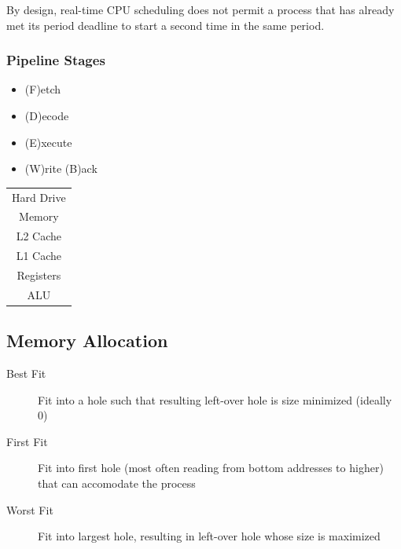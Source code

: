 \documentclass[a4paper]{article}
\begin{document}
\begin{multicols*}{2}
    By design, real-time CPU scheduling does not permit a process that has
    already met its period deadline to start a second time in the same period.

    \subsubsection*{Pipeline Stages}
    \begin{multicols*}{2}
        \setlength{\leftmargini}{1em}
        \begin{itemize}
            \item (F)etch
            \item (D)ecode
            \item (E)xecute
            \item (W)rite (B)ack
        \end{itemize}
        \columnbreak
        \begin{tabular}{|c|}
            \hline
            Hard Drive \\
            Memory     \\
            L2 Cache   \\
            L1 Cache   \\
            Registers  \\
            ALU        \\
            \hline
        \end{tabular}
    \end{multicols*}

    \subsection*{Memory Allocation}
    \begin{description}
        \item[Best Fit] Fit into a hole such that resulting left-over hole is
            size minimized (ideally 0)
        \item[First Fit] Fit into first hole (most often reading from bottom
            addresses to higher) that can accomodate the process
        \item[Worst Fit] Fit into largest hole, resulting in left-over hole
            whose size is maximized
    \end{description}


\end{multicols*}
\end{document}
